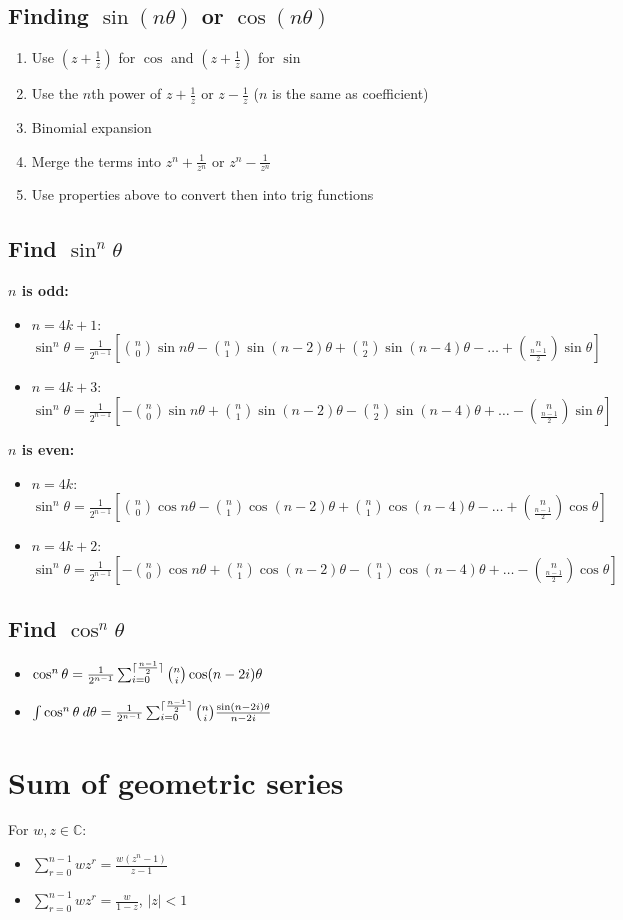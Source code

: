 \subsection{Finding $\sin (n\theta)$ or $\cos (n\theta)$}
\begin{enumerate}
    \item Use $\left(z+\frac{1}{z}\right)$ for $\cos$ and $\left(z+\frac{1}{z}\right)$ for $\sin$
    \item Use the $n$th power of $z+\frac{1}{z}$ or $z-\frac{1}{z}$ ($n$ is the same as coefficient)
    \item Binomial expansion
    \item Merge the terms into $z^n+\frac{1}{z^n}$ or $z^n-\frac{1}{z^n}$
    \item Use properties above to convert then into trig functions
\end{enumerate}
\subsection{Find $\sin^n\theta$}
\textbf{$n$ is odd:}
\begin{itemize}
    \item $n=4k+1$: $\sin^n\theta=\frac{1}{2^{n-1}}\left[\binom{n}{0}\sin n\theta - \binom{n}{1}\sin (n-2)\theta + \binom{n}{2}\sin (n-4)\theta - \dots + \binom{n}{\frac{n-1}{2}}\sin \theta\right]$
    \item $n=4k+3$: $\sin^n\theta=\frac{1}{2^{n-1}}\left[-\binom{n}{0}\sin n\theta + \binom{n}{1}\sin (n-2)\theta - \binom{n}{2}\sin (n-4)\theta + \dots - \binom{n}{\frac{n-1}{2}}\sin \theta\right]$
\end{itemize}
\textbf{$n$ is even:}
\begin{itemize}
    \item $n=4k$: $\sin^n\theta=\frac{1}{2^{n-1}}\left[\binom{n}{0}\cos n\theta - \binom{n}{1}\cos (n-2)\theta + \binom{n}{1}\cos (n-4)\theta - \dots + \binom{n}{\frac{n-1}{2}}\cos \theta\right]$
    \item $n=4k+2$: $\sin^n\theta=\frac{1}{2^{n-1}}\left[-\binom{n}{0}\cos n\theta + \binom{n}{1}\cos (n-2)\theta - \binom{n}{1}\cos (n-4)\theta + \dots - \binom{n}{\frac{n-1}{2}}\cos \theta\right]$
\end{itemize}
\subsection{Find $\cos^n\theta$}
\begin{itemize}
    \item $\cos^n\theta = \frac{1}{2^{n-1}}\sum_{i=0}^{\lceil\frac{n-1}{2}\rceil} \binom{n}{i}\cos (n-2i)\theta$
    \item $\int \cos^n\theta \: d\theta = \frac{1}{2^{n-1}} \sum_{i=0}^{\lceil\frac{n-1}{2}\rceil} \binom{n}{i} \frac{\sin (n-2i)\theta}{n-2i}$
\end{itemize}

\section{Sum of geometric series}
For $w, z \in \mathbb{C}$:
\begin{itemize}
    \item $\sum\limits_{r=0}^{n-1}wz^r=\frac{w(z^n-1)}{z-1}$
    \item $\sum\limits_{r=0}^{n-1}wz^r=\frac{w}{1-z}$, $|z|<1$
\end{itemize}

